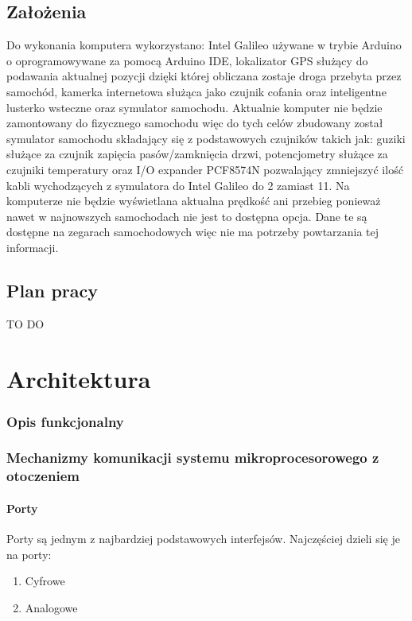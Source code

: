 \documentclass{xmgr}
\begin{document}
\section{Założenia}
Do wykonania komputera wykorzystano: Intel Galileo używane w trybie Arduino o oprogramowywane za pomocą Arduino IDE, lokalizator GPS służący do podawania aktualnej pozycji dzięki której obliczana zostaje droga przebyta przez samochód, kamerka internetowa służąca jako czujnik cofania oraz inteligentne lusterko wsteczne oraz symulator samochodu. Aktualnie komputer nie będzie zamontowany do fizycznego samochodu więc do tych celów zbudowany został symulator samochodu składający się z podstawowych czujników takich jak: guziki służące za czujnik zapięcia pasów/zamknięcia drzwi, potencjometry służące za czujniki temperatury oraz I/O expander PCF8574N pozwalający zmniejszyć ilość kabli wychodzących z symulatora do Intel Galileo do 2 zamiast 11. Na komputerze nie będzie wyświetlana aktualna prędkość ani przebieg ponieważ nawet w najnowszych samochodach nie jest to dostępna opcja. Dane te są dostępne na zegarach samochodowych więc nie ma potrzeby powtarzania tej informacji.
\section{Plan pracy}
TO DO

\chapter{Architektura}
\subsection{Opis funkcjonalny}
\subsection{Mechanizmy komunikacji systemu mikroprocesorowego z otoczeniem}
\subsubsection{Porty}

Porty są jednym z najbardziej podstawowych interfejsów. Najczęściej dzieli się je na porty:
\begin{enumerate}
	\item Cyfrowe
	\item Analogowe
\end{enumerate}
\end{document}
